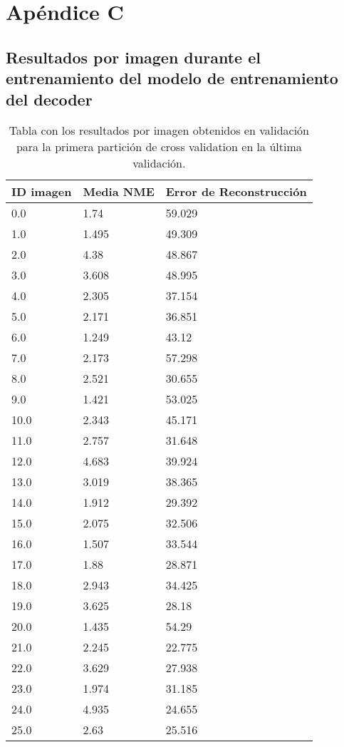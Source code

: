 
\chapter{Apéndice C}\label{ap:apendiceC}

\section{Resultados por imagen durante el entrenamiento del modelo de entrenamiento del decoder}

\begin{table}[!ht]
    \centering
    \caption{Tabla con los resultados por imagen obtenidos en validación para la primera partición de cross validation en la última validación.}
    \begin{tabular}{|l|l|l|}
    \hline
        ID imagen & Media NME & Error de Reconstrucción \\ \hline
        0.0 & 1.74 & 59.029 \\ \hline
        1.0 & 1.495 & 49.309 \\ \hline
        2.0 & 4.38 & 48.867 \\ \hline
        3.0 & 3.608 & 48.995 \\ \hline
        4.0 & 2.305 & 37.154 \\ \hline
        5.0 & 2.171 & 36.851 \\ \hline
        6.0 & 1.249 & 43.12 \\ \hline
        7.0 & 2.173 & 57.298 \\ \hline
        8.0 & 2.521 & 30.655 \\ \hline
        9.0 & 1.421 & 53.025 \\ \hline
        10.0 & 2.343 & 45.171 \\ \hline
        11.0 & 2.757 & 31.648 \\ \hline
        12.0 & 4.683 & 39.924 \\ \hline
        13.0 & 3.019 & 38.365 \\ \hline
        14.0 & 1.912 & 29.392 \\ \hline
        15.0 & 2.075 & 32.506 \\ \hline
        16.0 & 1.507 & 33.544 \\ \hline
        17.0 & 1.88 & 28.871 \\ \hline
        18.0 & 2.943 & 34.425 \\ \hline
        19.0 & 3.625 & 28.18 \\ \hline
        20.0 & 1.435 & 54.29 \\ \hline
        21.0 & 2.245 & 22.775 \\ \hline
        22.0 & 3.629 & 27.938 \\ \hline
        23.0 & 1.974 & 31.185 \\ \hline
        24.0 & 4.935 & 24.655 \\ \hline
        25.0 & 2.63 & 25.516 \\ \hline
    \end{tabular}
    \label{table:Decoder_images_1}
\end{table}

